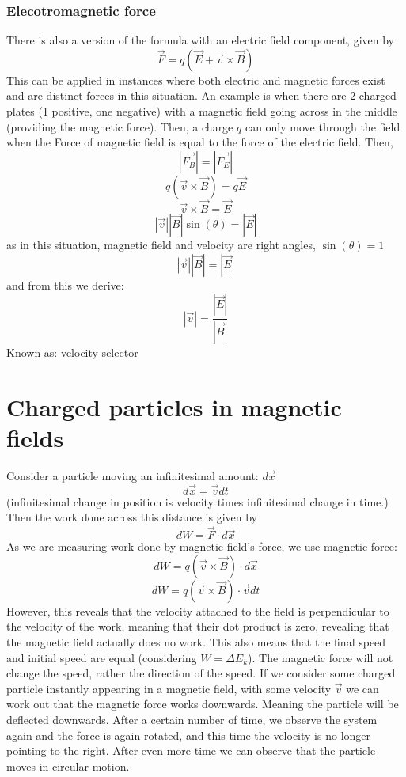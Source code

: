 \documentclass[10pt]{report}
\begin{document}
{{\subsubsection{Elecotromagnetic force}
\par{There is also a version of the formula with an electric field component, given by \[
		\vec{F}=q\left(\vec{E}+\vec{v}\times\vec{B}\right)
\] This can be applied in instances where both electric and magnetic forces exist and are distinct forces in this situation. An example is when there are 2 charged plates (1 positive, one negative) with a magnetic field going across in the middle (providing the magnetic force). Then, a charge $q$ can only move through the field when the Force of magnetic field is equal to the force of the electric field. Then, \[
\left|\vec{F_{B}}\right|=\left|\vec{F_{E}}\right|
\] \[
q\left(\vec{v}\times\vec{B}\right)=q\vec{E}
\] \[
\vec{v}\times\vec{B}=\vec{E}
\] \[
\left|\vec{v}\right|\left|\vec{B}\right|\sin\left(\theta\right)=\left|\vec{E}\right|
\] as in this situation, magnetic field and velocity are right angles, $\sin\left(\theta\right)=1$ \[
\left|\vec{v}\right|\left|\vec{B}\right|=\left|\vec{E}\right|
\] and from this we derive: \[
\left|\vec{v}\right|=\frac{\left|\vec{E}\right|}{\left|\vec{B}\right|}
\] Known as: velocity selector}
\section{Charged particles in magnetic fields}
\par{Consider a particle moving an infinitesimal amount: $d\vec{x}$ \[
d\vec{x}=\vec{v}dt
\] (infinitesimal change in position is velocity times infinitesimal change in time.) Then the work done across this distance is given by \[
dW=\vec{F}\cdot d\vec{x}
\] As we are measuring work done by magnetic field's force, we use magnetic force: \[
dW=q\left(\vec{v}\times\vec{B}\right)\cdot d\vec{x}
\] \[
dW=q\left(\vec{v}\times\vec{B}\right)\cdot \vec{v}dt
\] However, this reveals that the velocity attached to the field is perpendicular to the velocity of the work, meaning that their dot product is zero, revealing that the magnetic field actually does no work. This also means that the final speed and initial speed are equal (considering $W=\Delta E_{k}$). The magnetic force will not change the speed, rather the direction of the speed. If we consider some charged particle instantly appearing in a magnetic field, with some velocity $\vec{v}$ we can work out that the magnetic force works downwards. Meaning the particle will be deflected downwards. After a certain number of time, we observe the system again and the force is again rotated, and this time the velocity is no longer pointing to the right. After even more time we can observe that the particle moves in circular motion. 

}}}
\end{document}

